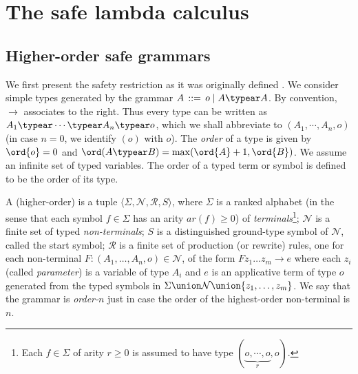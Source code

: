





\section{The safe lambda calculus}
\label{sec:safe}
\subsection*{Higher-order safe grammars}
We first present the safety restriction as it was originally defined
\cite{KNU02}. We consider simple types generated by the grammar $A \,
::= \, o \; | \; A \typear A$. By convention, $\rightarrow$ associates
to the right. Thus every type can be written as $A_1 \typear \cdots
\typear A_n \typear o$, which we shall abbreviate to $(A_1, \cdots,
A_n, o)$ (in case $n = 0$, we identify $(o)$ with $o$). The
\emph{order} of a type is given by $\ord{o} = 0$ and $\ord(A \typear
B) = \max(\ord{A}+1, \ord{B})$. We assume an infinite set of typed
variables. The order of a typed term or symbol is defined to be the
order of its type.

A (higher-order)  is a tuple $\langle
\Sigma, \mathcal{N}, \mathcal{R}, S \rangle$, where $\Sigma$ is a
ranked alphabet (in the sense that each symbol $f \in \Sigma$ has an
arity $\mathit{ar}(f) \geq 0$) of \emph{terminals}\footnote{Each $f \in
  \Sigma$ of arity $r \geq 0$ is assumed to have type $(\underbrace{o,
    \cdots, o}_r, o)$.}; $\mathcal{N}$ is a finite set of typed
\emph{non-terminals}; $S$ is a distinguished ground-type symbol of
$\mathcal{N}$, called the start symbol; $\mathcal{R}$ is a finite set
of production (or rewrite) rules, one for each non-terminal $F : (A_1,
\ldots, A_n, o) \in \mathcal{N}$, of the form $ F z_1 \ldots z_m
\rightarrow e$ where each $z_i$ (called \emph{parameter}) is a
variable of type $A_i$ and $e$ is an applicative term of type $o$
generated from the typed symbols in $\Sigma \union \mathcal{N} \union \{z_1,
\ldots, z_m \}$. We say that the grammar is \emph{order-$n$} just in
case the order of the highest-order non-terminal is $n$.

